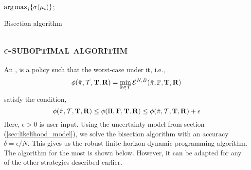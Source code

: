 {\begin{algorithm}
\Return $\operatorname*{arg\,max}_i \{\sigma(\mu_i)\}$;
\caption{Bisection algorithm}
\label{alg:bisection_algorithm}
\end{algorithm}


\subsection{\textsc{\texorpdfstring{$\epsilon$}{epsilon}-suboptimal algorithm}}

An {\epsilonsuboptimal}, {\epsilonsuboptimalpolicy} is a policy such that the worst-case {\totalexpectedearnings} under it, i.e., 
\begin{equation}
\phi(\hat{\pi}, \mathcal{T}, {\mathbf{T}}, {\mathbf{R}}) = \min_{\mathbb{P} \in \mathcal{T}} \mathcal{E}^{N,B}(\hat{\pi}, \mathbb{P}, {\mathbf{T}}, {\mathbf{R}})
\end{equation}
satisfy the condition,
\begin{equation*}
\phi(\hat{\pi}, \mathcal{T}, {\mathbf{T}}, {\mathbf{R}}) \leq \phi(\Pi, {\mathbf{F}}, {\mathbf{T}}, {\mathbf{R}}) \leq \phi(\hat{\pi}, \mathcal{T}, {\mathbf{T}}, {\mathbf{R}}) + \epsilon
\end{equation*}
Here, $\epsilon > 0$ is user input. Using the uncertainty model from section (\ref{sec:likelihood_model}), we solve the bisection algorithm with an accuracy $\delta = \epsilon / N$. 
This gives us the robust finite horizon dynamic programming algorithm. The algorithm for the most {\relocationflexible} is shown below. However, it can be adapted for any of the other strategies described earlier.
\begin{algorithm}
\LinesNumbered
\KwIn{$\empiricaltransitionmatrix, \traveltimematrix, \rewardsmatrix, \epsilon, \beta$}


\end{algorithm}}
